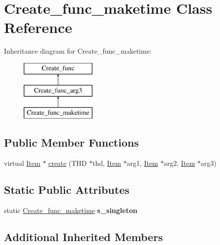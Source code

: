 \hypertarget{classCreate__func__maketime}{}\section{Create\+\_\+func\+\_\+maketime Class Reference}
\label{classCreate__func__maketime}
Inheritance diagram for Create\+\_\+func\+\_\+maketime\+:\begin{figure}[H]
\begin{center}
\leavevmode
\includegraphics[height=3.000000cm]{classCreate__func__maketime}
\end{center}
\end{figure}
\subsection*{Public Member Functions}
\begin{DoxyCompactItemize}
\item 
virtual \mbox{\hyperlink{classItem}{Item}} $\ast$ \mbox{\hyperlink{classCreate__func__maketime_a8953b1f53570da621baebfc1026ce47d}{create}} (T\+HD $\ast$thd, \mbox{\hyperlink{classItem}{Item}} $\ast$arg1, \mbox{\hyperlink{classItem}{Item}} $\ast$arg2, \mbox{\hyperlink{classItem}{Item}} $\ast$arg3)
\end{DoxyCompactItemize}
\subsection*{Static Public Attributes}
\begin{DoxyCompactItemize}
\item 
\mbox{\label{classCreate__func__maketime_a1ec6b5d240b22d59a69b87955c7b44dc}} 
static \mbox{\hyperlink{classCreate__func__maketime}{Create\+\_\+func\+\_\+maketime}} {\bfseries s\+\_\+singleton}
\end{DoxyCompactItemize}
\subsection*{Additional Inherited Members}


